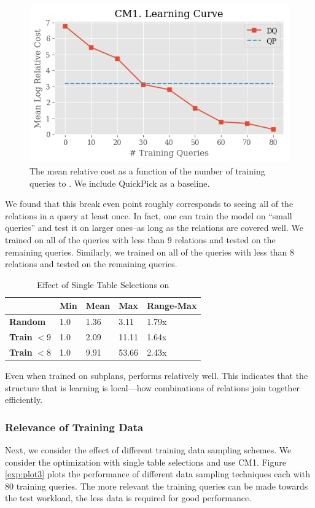 \begin{figure}
    \centering
    \includegraphics[width=0.8\columnwidth]{exp/exp2_plot1.png}
    \caption{The mean relative cost as a function of the number of training queries to \sys. We include QuickPick as a baseline. \label{exp:plot2}}
\end{figure}

We found that this break even point roughly corresponds to seeing all of the relations in a query at least once. In fact, one can train the model on ``small queries'' and test it on larger ones--as long as the relations are covered well. We trained \sys on all of the queries with less than 9 relations and tested on the remaining queries. Similarly, we trained on all of the queries with less than 8 relations and tested on the remaining queries. 

\begin{table}[ht!]\centering \small
\caption{Effect of Single Table Selections on \sys }\vspace{0.25em}
\begin{tabular}{|l|l|l|l|l|}\hline
    & {\bf Min}  & {\bf Mean}  & {\bf Max}    & {\bf Range-Max} \\ \hline
{\bf Random}  & 1.0  & 1.36   & 3.11    & 1.79x\\ \hline
{\bf Train} $< 9$  & 1.0  & 2.09   & 11.11    & 1.64x\\ \hline
{\bf Train} $< 8$  & 1.0  & 9.91   & 53.66    & 2.43x\\ \hline
\end{tabular}
\end{table}

Even when trained on subplans, \sys performs relatively well. This indicates that the structure that \sys is learning is local---how combinations of relations join together efficiently.

\subsubsection{Relevance of Training Data}
Next, we consider the effect of different training data sampling schemes. 
We consider the optimization with single table selections and use CM1.
Figure \ref{exp:plot3} plots the performance of different data sampling techniques each with 80 training queries. The more relevant the training queries can be made towards the test workload, the less data is required for good performance.

